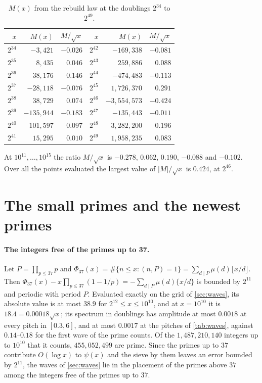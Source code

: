 \documentclass[11pt]{article}
\theoremstyle{definition}\newtheorem{definition}[theorem]{Definition}
\theoremstyle{remark}\newtheorem{remark}[theorem]{Remark}
\newcommand{\fr}[1]{\{#1\}}
\begin{document}
\begin{table}[h]\centering\small
\begin{tabular}{@{}rrr@{\qquad}rrr@{}}\toprule
$x$ & $M(x)$ & $M/\sqrt x$ & $x$ & $M(x)$ & $M/\sqrt x$\\\midrule
$2^{34}$ & $-3{,}421$ & $-0.026$ & $2^{42}$ & $-169{,}338$ & $-0.081$\\
$2^{35}$ & $8{,}435$ & $0.046$ & $2^{43}$ & $259{,}886$ & $0.088$\\
$2^{36}$ & $38{,}176$ & $0.146$ & $2^{44}$ & $-474{,}483$ & $-0.113$\\
$2^{37}$ & $-28{,}118$ & $-0.076$ & $2^{45}$ & $1{,}726{,}370$ & $0.291$\\
$2^{38}$ & $38{,}729$ & $0.074$ & $2^{46}$ & $-3{,}554{,}573$ & $-0.424$\\
$2^{39}$ & $-135{,}944$ & $-0.183$ & $2^{47}$ & $-135{,}443$ & $-0.011$\\
$2^{40}$ & $101{,}597$ & $0.097$ & $2^{48}$ & $3{,}282{,}200$ & $0.196$\\
$2^{41}$ & $15{,}295$ & $0.010$ & $2^{49}$ & $1{,}958{,}235$ & $0.083$\\\bottomrule
\end{tabular}
\caption{$M(x)$ from the rebuild law at the doublings $2^{34}$ to $2^{49}$.}\label{tab:doublings}
\end{table}

At $10^{11},\dots,10^{15}$ the ratio $M/\sqrt x$ is $-0.278$, $0.062$, $0.190$, $-0.088$ and $-0.102$. Over all the points evaluated the largest value of $|M|/\sqrt x$ is $0.424$, at $2^{46}$.

\section{The small primes and the newest primes}\label{sec:small}

\paragraph{The integers free of the primes up to 37.} Let $P=\prod_{p\le37}p$ and $\Phi_{37}(x)=\#\{n\le x:(n,P)=1\}=\sum_{d\mid P}\mu(d)\lfloor x/d\rfloor$. Then $\Phi_{37}(x)-x\prod_{p\le37}(1-1/p)=-\sum_{d\mid P}\mu(d)\fr{x/d}$ is bounded by $2^{11}$ and periodic with period $P$. Evaluated exactly on the grid of \cref{sec:waves}, its absolute value is at most $38.9$ for $2^{12}\le x\le10^{10}$, and at $x=10^{10}$ it is $18.4=0.00018\sqrt x$; its spectrum in doublings has amplitude at most $0.0018$ at every pitch in $[0.3,6]$, and at most $0.0017$ at the pitches of \cref{tab:waves}, against $0.14$--$0.18$ for the first wave of the prime counts. Of the $1{,}487{,}210{,}140$ integers up to $10^{10}$ that it counts, $455{,}052{,}499$ are prime. Since the primes up to $37$ contribute $O(\log x)$ to $\psi(x)$ and the sieve by them leaves an error bounded by $2^{11}$, the waves of \cref{sec:waves} lie in the placement of the primes above $37$ among the integers free of the primes up to $37$.
\end{document}
